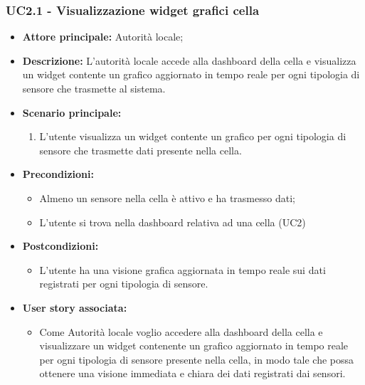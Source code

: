 \subsubsection{UC2.1 - Visualizzazione widget grafici cella}
\begin{itemize}
    \item \textbf{Attore principale:} Autorità locale;
    \item \textbf{Descrizione:} L'autorità locale accede alla dashboard della cella e visualizza un widget contente un grafico aggiornato in tempo reale per ogni tipologia di sensore che trasmette al sistema.
    \item \textbf{Scenario principale:}
          \begin{enumerate}
              \item L'utente visualizza un widget contente un grafico per ogni tipologia di sensore che trasmette dati presente nella cella.
          \end{enumerate}
    \item \textbf{Precondizioni:}
          \begin{itemize}
              \item  Almeno un sensore nella cella è attivo e ha trasmesso dati;
              \item L'utente si trova nella dashboard relativa ad una cella (UC2)
          \end{itemize}
    \item \textbf{Postcondizioni:}
          \begin{itemize}
              \item      L'utente ha una visione grafica aggiornata in tempo reale sui dati registrati per ogni tipologia di sensore.
          \end{itemize}
    \item \textbf{User story associata:}
          \begin{itemize}
              \item Come Autorità locale voglio accedere alla dashboard della cella e visualizzare un widget contenente un grafico aggiornato in tempo reale per ogni tipologia di sensore presente nella cella,
                    in modo tale che possa ottenere una visione immediata e chiara dei dati registrati dai sensori.
          \end{itemize}
\end{itemize}